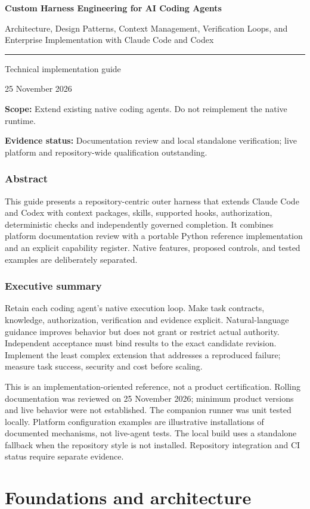 \documentclass[11pt,letterpaper]{article}
\begin{document}
\raggedright
\begin{titlepage}
\color{Navy}
\vspace*{1.1in}
{\sffamily\bfseries\Huge Custom Harness Engineering for AI Coding Agents\par}
\vspace{0.35in}
{\sffamily\Large Architecture, Design Patterns, Context Management, Verification Loops, and Enterprise Implementation with Claude Code and Codex\par}
\vspace{0.35in}\rule{\linewidth}{1pt}\par
{\large Technical implementation guide\par}
\vspace{0.15in}25 November 2026\par
\vfill
\textbf{Scope:} Extend existing native coding agents. Do not reimplement the native runtime.\par
\textbf{Evidence status:} Documentation review and local standalone verification; live platform and repository-wide qualification outstanding.
\end{titlepage}
\section*{Abstract}
This guide presents a repository-centric outer harness that extends Claude Code and Codex with context packages, skills, supported hooks, authorization, deterministic checks and independently governed completion. It combines platform documentation review with a portable Python reference implementation and an explicit capability register. Native features, proposed controls, and tested examples are deliberately separated.
\section*{Executive summary}
Retain each coding agent's native execution loop. Make task contracts, knowledge, authorization, verification and evidence explicit. Natural-language guidance improves behavior but does not grant or restrict actual authority. Independent acceptance must bind results to the exact candidate revision. Implement the least complex extension that addresses a reproduced failure; measure task success, security and cost before scaling.

This is an implementation-oriented reference, not a product certification. Rolling documentation was reviewed on 25 November 2026; minimum product versions and live behavior were not established. The companion runner was unit tested locally. Platform configuration examples are illustrative installations of documented mechanisms, not live-agent tests. The local build uses a standalone fallback when the repository style is not installed. Repository integration and CI status require separate evidence.
\clearpage\tableofcontents\clearpage\listoffigures\clearpage\listoftables\clearpage{}
\clearpage\part{Foundations and architecture}
\end{document}
